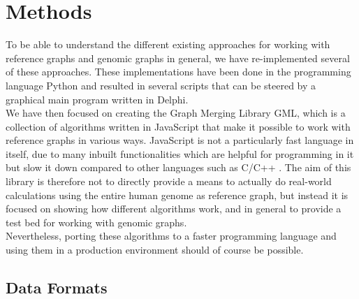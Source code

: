 \documentclass[a4paper,12pt,twoside,BCOR=10mm]{scrbook}
\begin{document}
\chapter{Methods}
%

To be able to understand the different existing approaches for working with
reference graphs and genomic graphs in general, we have re-implemented several
of these approaches. These implementations have been done in the programming
language Python and resulted in several scripts that can be steered
by a graphical main program written in Delphi. \\
We have then focused on creating the Graph Merging Library GML, which is a
collection of algorithms written in JavaScript that make it possible to
work with reference graphs in various ways. JavaScript is not a particularly fast
language in itself, due to many inbuilt functionalities which are helpful for programming
in it but slow it down compared to other languages such as C/C++ \citep{Taivalsaari2008}.
The aim of this library is therefore not to directly provide a means to actually do
real-world calculations using the entire human genome as reference graph,
but instead it is focused on showing how different algorithms work,
and in general to provide a test bed for working with genomic graphs. \\
Nevertheless, porting these algorithms to a faster programming language
and using them in a production environment should of course be possible.

\section{Data Formats}
\label{sec:methods_data_formats}
%
\end{document}
